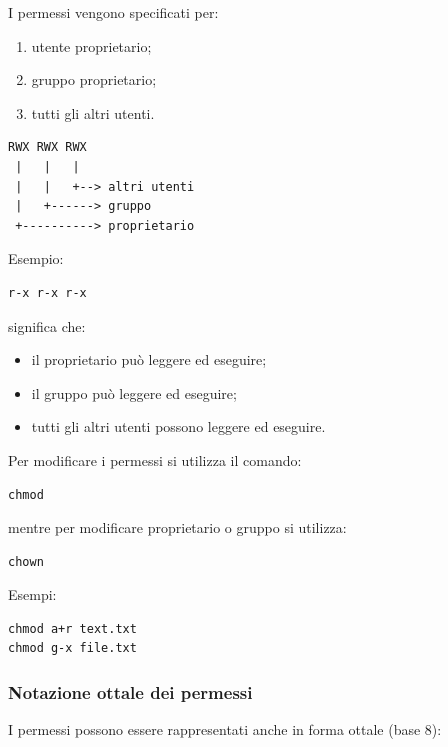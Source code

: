 \medskip

\noindent I permessi vengono specificati per:

\begin{enumerate}
    \item utente proprietario;
    \item gruppo proprietario;
    \item tutti gli altri utenti.
\end{enumerate}

\begin{verbatim}
RWX RWX RWX
 |   |   |
 |   |   +--> altri utenti
 |   +------> gruppo
 +----------> proprietario
\end{verbatim}

\medskip

\noindent Esempio:

\begin{verbatim}
r-x r-x r-x
\end{verbatim}

\noindent
significa che:

\begin{itemize}
    \item il proprietario può leggere ed eseguire;
    
    \item il gruppo può leggere ed eseguire;
    
    \item tutti gli altri utenti possono leggere ed eseguire.
\end{itemize}

\bigskip

\noindent Per modificare i permessi si utilizza il comando:

\begin{verbatim}
chmod
\end{verbatim}

\noindent
mentre per modificare proprietario o gruppo si utilizza:

\begin{verbatim}
chown
\end{verbatim}

\medskip

\noindent Esempi:

\begin{verbatim}
chmod a+r text.txt
chmod g-x file.txt
\end{verbatim}

\bigskip

\subsubsection*{Notazione ottale dei permessi}
I permessi possono essere rappresentati anche in forma ottale (base 8):

